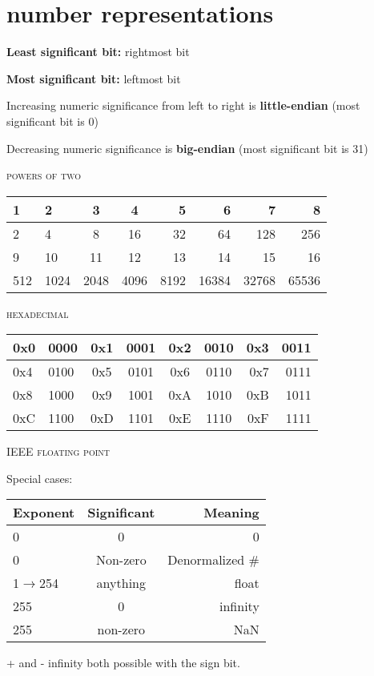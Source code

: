 \documentclass{article}
\begin{document}
\section{number representations} %
\label{sec:number_representations}

{\bf Least significant bit:} rightmost bit

{\bf Most significant bit:} leftmost bit

Increasing numeric significance from left to right is \textbf{little-endian} (most significant bit is 0)

Decreasing numeric significance is {\bf big-endian} (most significant bit is 31)

\begin{center}\textsc{powers of two}\end{center} 
\begin{center}
\begin{tabular}{ | l | l | c | c | r | r | r | r |}
\hline
1 & 2 & 3 & 4 & 5 & 6 & 7 & 8\\ \hline
2 & 4 & 8 & 16 & 32 & 64 & 128 & 256\\ \hline\hline
9 & 10 & 11 & 12 & 13 & 14 & 15 & 16 \\ \hline
512 & 1024 & 2048 & 4096 & 8192 & 16384 & 32768 & 65536 \\ \hline\hline
\end{tabular}	
\end{center}
	
\begin{center}\textsc{hexadecimal}\end{center} 
\begin{center}
\begin{tabular}{ | l | l || c | c || c | c || r | r |}
\hline
0x0 & 0000 & 0x1 & 0001 & 0x2 & 0010 & 0x3 & 0011 \\ \hline \hline
0x4 & 0100 & 0x5 & 0101 & 0x6 & 0110 & 0x7 & 0111 \\ \hline \hline
0x8 & 1000 & 0x9 & 1001 & 0xA & 1010 & 0xB & 1011 \\ \hline \hline
0xC & 1100 & 0xD & 1101 & 0xE & 1110 & 0xF & 1111 \\ \hline 
\end{tabular}
\end{center}
\begin{center}\textsc{IEEE floating point}\end{center} 

Special cases: 
\begin{center}
\begin{tabular}{ | l  |  c  ||  r |}
\hline 
Exponent & Significant & Meaning \\ \hline
0 & 0 & 0 \\ \hline
0 & Non-zero & Denormalized \# \\ \hline
1$\rightarrow$254 & anything & float \\ \hline
255 & 0 & infinity \\ \hline
255 & non-zero & NaN \\ \hline
\end{tabular}
\end{center}
+ and - infinity both possible with the sign bit.
\end{document}

